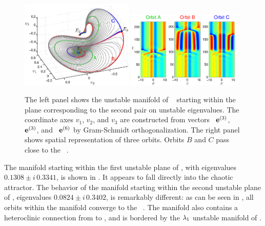 \begin{figure}[t]
\begin{center}
\includegraphics[width=0.48\textwidth]{figs/ks22_E1_plane2_manifold_c.eps}
\includegraphics[width=0.48\textwidth]{figs/ks22_E1_plane2_orbits_c.eps}
\end{center}
\caption{
The left panel shows the unstable
manifold of \eqv\  starting within the plane
corresponding to the second pair on unstable eigenvalues. The
coordinate axes $v_1$, $v_2$, and $v_3$ are constructed from vectors
\Re\, $\jEigvec{3}$, \Im\, $\jEigvec{3}$, and \Re\, $\jEigvec{6}$
by Gram-Schmidt orthogonalization.
The right panel shows spatial representation of three orbits. Orbits
$B$ and $C$ pass close to the \eqv\ .
   }
\label{f:KS22E1man2}
\end{figure}

The manifold starting within the first unstable plane of , with
eigenvalues $0.1308\pm i\,0.3341$, is shown in
. It appears to fall directly into the
chaotic attractor.  The behavior of the manifold starting within
the second unstable plane of , eigenvalues $0.0824\pm i \, 0.3402$, is
remarkably different: as can be seen in ,
all orbits within the manifold converge to the \eqv\ .  The
manifold also contains a heteroclinic connection from  to ,
and is bordered by the $\eigExp[1]$ unstable manifold of .


